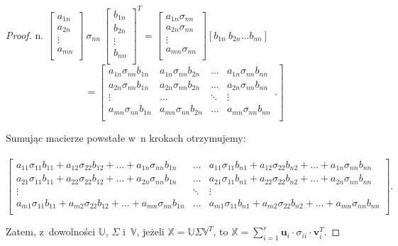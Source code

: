 \documentclass[12pt,a4paper]{report}
\begin{document}
\begin{proof}
n.
$\left[ \begin{array}{c}
         a_{1n} \\
         a_{2n} \\
         \vdots \\
         a_{mn} \\
         \end{array}
      \right] \: \sigma_{nn} \: \left[ \begin{array}{c}
         b_{1n} \\
         b_{2n} \\
         \vdots \\
         b_{nn} \\
         \end{array}
      \right]^T= \left[
        \begin{array}{c}
         a_{1n} \sigma_{nn} \\
         a_{2n} \sigma_{nn} \\
         \vdots \\
         a_{mn} \sigma_{nn} \\
         \end{array}
      \right] [b_{1n} \: b_{2n} \ldots b_{nn}] $
      $$=  \left[
        \begin{array}{cccc}
         a_{1n} \sigma_{nn} b_{1n}  & a_{1n} \sigma_{nn} b_{2n} & \ldots & a_{1n} \sigma_{nn} b_{nn}  \\
         a_{2n} \sigma_{nn} b_{1n} & a_{2n} \sigma_{nn} b_{2n} & \ldots & a_{2n} \sigma_{nn} b_{nn} \\
         \vdots & \ldots & \ddots & \vdots \\
         a_{mn} \sigma_{nn} b_{1n} & a_{mn} \sigma_{nn} b_{2n} & \ldots & a_{mn} \sigma_{nn} b_{nn} \\
         \end{array}.
      \right] $$

Sumując macierze powstałe w~n krokach otrzymujemy:
\\
\\$\left[
        \begin{array}{ccc}
a_{11} \sigma_{11} b_{11} + a_{12} \sigma_{22} b_{12} + \ldots + a_{1n} \sigma_{nn} b_{1n} & \ldots &  a_{11} \sigma_{11} b_{n1} + a_{12} \sigma_{22} b_{n2} + \ldots + a_{1n} \sigma_{nn} b_{nn} \\
a_{21} \sigma_{11} b_{11} + a_{22} \sigma_{22} b_{12} + \ldots + a_{2n} \sigma_{nn} b_{1n} & \ldots & a_{21} \sigma_{11} b_{n1} + a_{22} \sigma_{22} b_{n2} + \ldots + a_{2n} \sigma_{nn} b_{nn} \\
         \vdots & \ddots & \vdots \\
a_{m1} \sigma_{11} b_{11} + a_{m2} \sigma_{22} b_{12} + \ldots + a_{mn} \sigma_{nn} b_{1n} & \ldots & a_{m1} \sigma_{11} b_{n1} + a_{m2} \sigma_{22} b_{n2} + \ldots + a_{mn} \sigma_{nn} b_{nn} \\
         \end{array}
      \right].$

\bigskip
Zatem, z~dowolności $\mathbb{U}$, $\Sigma$ i~$\mathbb{V}$, jeżeli $\mathbb{X}=\mathbb{U} \Sigma \mathbb{V}^T$, to $\mathbb{X} = \sum_{i=1}^r \mathbf{u}_i \cdot\sigma_{ii} \cdot \mathbf{v}_i^T$.
\end{proof}
\bigskip
\end{document}
